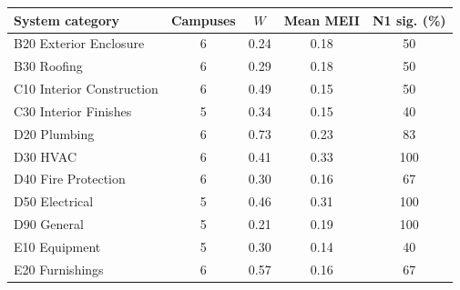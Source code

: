 \begin{tabular}{lcccc}
\toprule
System category & Campuses & $W$ & Mean MEII & N1 sig. (\%) \\
\midrule
B20 Exterior Enclosure & 6 & 0.24 & 0.18 & 50 \\
B30 Roofing & 6 & 0.29 & 0.18 & 50 \\
C10 Interior Construction & 6 & 0.49 & 0.15 & 50 \\
C30 Interior Finishes & 5 & 0.34 & 0.15 & 40 \\
D20 Plumbing & 6 & 0.73 & 0.23 & 83 \\
D30 HVAC & 6 & 0.41 & 0.33 & 100 \\
D40 Fire Protection & 6 & 0.30 & 0.16 & 67 \\
D50 Electrical & 5 & 0.46 & 0.31 & 100 \\
D90 General & 5 & 0.21 & 0.19 & 100 \\
E10 Equipment & 5 & 0.30 & 0.14 & 40 \\
E20 Furnishings & 6 & 0.57 & 0.16 & 67 \\
\bottomrule
\end{tabular}
